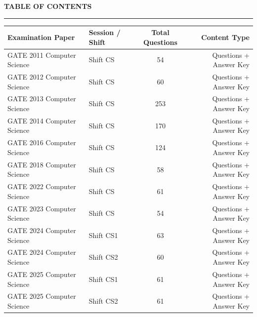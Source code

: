 \documentclass[a4paper,10pt,twoside]{article}
\begin{document}
\newpage

\begin{center}
    {\Large\textbf{TABLE OF CONTENTS}}\\[0.4em]
    \rule{0.5\textwidth}{0.6pt}
\end{center}
\vspace{1em}

\noindent\begin{tabularx}{\linewidth}{|X|l|c|r|}
\hline
\textbf{Examination Paper} & \textbf{Session / Shift} & \textbf{Total Questions} & \textbf{Content Type} \\
\hline

GATE 2011 Computer Science & Shift CS & 54 & Questions + Answer Key \\ \hline
GATE 2012 Computer Science & Shift CS & 60 & Questions + Answer Key \\ \hline
GATE 2013 Computer Science & Shift CS & 253 & Questions + Answer Key \\ \hline
GATE 2014 Computer Science & Shift CS & 170 & Questions + Answer Key \\ \hline
GATE 2016 Computer Science & Shift CS & 124 & Questions + Answer Key \\ \hline
GATE 2018 Computer Science & Shift CS & 58 & Questions + Answer Key \\ \hline
GATE 2022 Computer Science & Shift CS & 61 & Questions + Answer Key \\ \hline
GATE 2023 Computer Science & Shift CS & 54 & Questions + Answer Key \\ \hline
GATE 2024 Computer Science & Shift CS1 & 63 & Questions + Answer Key \\ \hline
GATE 2024 Computer Science & Shift CS2 & 60 & Questions + Answer Key \\ \hline
GATE 2025 Computer Science & Shift CS1 & 61 & Questions + Answer Key \\ \hline
GATE 2025 Computer Science & Shift CS2 & 61 & Questions + Answer Key \\ \hline
\end{tabularx}

\vspace{1.5em}

\newpage
\end{document}
